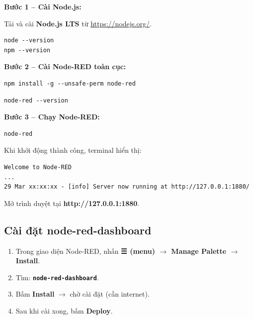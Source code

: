 \documentclass[13pt,a4paper]{article}
\newcommand{\code}[1]{\texttt{#1}}
\begin{document}
\textbf{Bước 1 -- Cài Node.js:}

Tải và cài \textbf{Node.js LTS} từ \url{https://nodejs.org/}.

\begin{lstlisting}[style=bashcode, caption={Kiểm tra cài đặt Node.js}, label={lst:node}]
node --version
npm --version
\end{lstlisting}

\textbf{Bước 2 -- Cài Node-RED toàn cục:}

\begin{lstlisting}[style=bashcode, caption={Cài đặt Node-RED}, label={lst:nr}]
npm install -g --unsafe-perm node-red
\end{lstlisting}

\begin{lstlisting}[style=bashcode, caption={Kiểm tra phiên bản Node-RED}, label={lst:nrver}]
node-red --version
\end{lstlisting}

\textbf{Bước 3 -- Chạy Node-RED:}

\begin{lstlisting}[style=bashcode, caption={Chạy Node-RED}, label={lst:nrrun}]
node-red
\end{lstlisting}

Khi khởi động thành công, terminal hiển thị:

\begin{lstlisting}[style=flowcode, caption={Output khi khởi động Node-RED}, label={lst:nrlog}]
Welcome to Node-RED
...
29 Mar xx:xx:xx - [info] Server now running at http://127.0.0.1:1880/
\end{lstlisting}

Mở trình duyệt tại \textbf{http://127.0.0.1:1880}.

\subsection{Cài đặt node-red-dashboard}
\label{sec:dashboardinstall}

\begin{enumerate}[label=\arabic*., leftmargin=1.5cm]
    \item Trong giao diện Node-RED, nhấn \textbf{☰ (menu) $\rightarrow$ Manage Palette $\rightarrow$ Install}.
    \item Tìm: \textbf{\code{node-red-dashboard}}.
    \item Bấm \textbf{Install} $\rightarrow$ chờ cài đặt (cần internet).
    \item Sau khi cài xong, bấm \textbf{Deploy}.
\end{enumerate}
\end{document}
